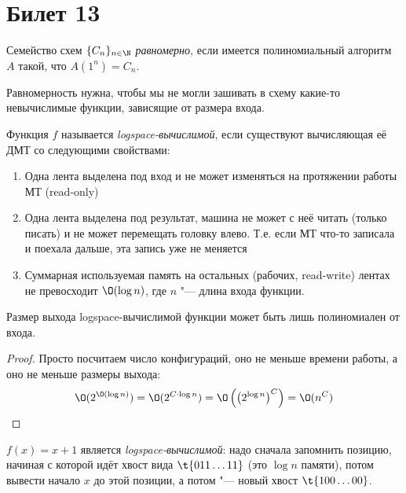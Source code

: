 \setcounter{section}{12}
\section{Билет 13}
	\begin{Def}
		Семейство схем $\{C_n\}_{n\in\N}$ \textit{равномерно}, если имеется полиномиальный алгоритм $A$ такой,
		что $A(1^n)=C_n$.
	\end{Def}
	\begin{Rem}
		Равномерность нужна, чтобы мы не могли зашивать в схему какие-то невычислимые функции, зависящие от размера входа.
	\end{Rem}
	\begin{Def}
		Функция $f$ называется \textit{logspace-вычислимой}, если существуют вычисляющая её ДМТ со следующими свойствами:
		\begin{enumerate}
			\item Одна лента выделена под вход и не может изменяться на протяжении работы МТ (read-only)
			\item
				Одна лента выделена под результат, машина не может с неё читать (только писать) и не может перемещать головку влево.
				Т.е. если МТ что-то записала и поехала дальше, эта запись уже не меняется
			\item Суммарная используемая память на остальных (рабочих, read-write) лентах не превосходит $\O(\log n)$, где $n$ "--- длина входа функции.
		\end{enumerate}
	\end{Def}
	\begin{assertion}
		Размер выхода logspace-вычислимой функции может быть лишь полиномиален от входа.
	\end{assertion}
	\begin{proof}
		Просто посчитаем число конфигураций, оно не меньше времени работы, а оно не меньше размеры выхода:
		\[ \O(2^{\O(\log n)})=\O(2^{C\cdot \log n})=\O\left(\left(2^{\log n}\right)^C\right)=\O(n^C) \]
	\end{proof}
	\begin{exmp}
		$f(x)=x+1$ является \textit{logspace-вычислимой}: надо сначала запомнить позицию, начиная с которой идёт хвост вида $\t{011\dots11}$ (это $\log n$ памяти),
		потом вывести начало $x$ до этой позиции, а потом "--- новый хвост $\t{100\dots00}$.
	\end{exmp}

